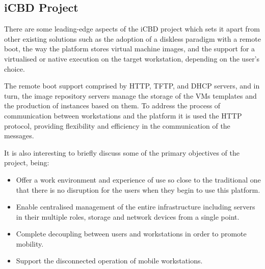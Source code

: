 


\subsection{iCBD Project} %
\label{sub:icbd_project}

There are some leading-edge aspects of the \acrfull{iCBD} project which sets it apart from other existing solutions such as the adoption of a diskless paradigm with a remote boot, the way the platform stores virtual machine images, and the support for a virtualised or native execution on the target workstation, depending on the user's choice.~\cite{P2020}

The remote boot support comprised by \acrshort{HTTP}, \acrshort{TFTP}, and \acrshort{DHCP} servers, and in turn, the image repository servers manage the storage of the VMs templates and the production of instances based on them.
To address the process of communication between workstations and the platform it is used the HTTP protocol, providing flexibility and efficiency in the communication of the messages.~\cite{P2020,Nuno2016,Eduardo2016}



It is also interesting to briefly discuss some of the primary objectives of the project, being:
\begin{itemize}
    \item Offer a work environment and experience of use so close to the traditional one that there is no disruption for the users when they begin to use this platform.
    \item Enable centralised management of the entire infrastructure including servers in their multiple roles, storage and network devices from a single point.
    \item Complete decoupling between users and workstations in order to promote mobility.
    \item Support the disconnected operation of mobile workstations.
\end{itemize}

